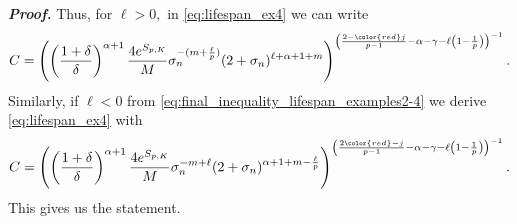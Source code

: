 \documentclass[11pt,reqno]{amsart}
\theoremstyle{definition}
\numberwithin{equation}{section}
\renewenvironment{proof}{\smallskip\noindent\emph{\textbf{Proof.}}%
  \hspace{1pt}}{\hspace{-5pt}{\nobreak\quad\nobreak\hfill\nobreak%
    $\square$\vspace{2pt}\par}\smallskip\goodbreak}
\newcommand\red[1]{{\color{red}#1}}
\newcommand{\eps}{\varepsilon}
\begin{document}
\begin{proof}
%
%
%
%
%
%
%
%
Thus, for $\ell>0,$ in \eqref{eq:lifespan_ex4} we can write  
%
\begin{align}
C=\left(\left(\frac{1+\delta}{\delta}\right)^{\alpha+1}\frac{4 e^{S_{p,K}}}{M}\sigma_n^{-(m+\frac{\ell}{p})}(2+\sigma_n)^{\ell+\alpha+1+m}\right)^{\left(\frac{2-\red{j}}{p-1}-\alpha-\gamma-\ell\left(1-\frac{1}{p}\right)\right)^{-1}}.
\end{align}
%
Similarly, if $\ell<0$ from \eqref{eq:final_inequality_lifespan_examples2-4} we derive \eqref{eq:lifespan_ex4} with 
%
\begin{align}
C=\left(\left(\frac{1+\delta}{\delta}\right)^{\alpha+1}\frac{4 e^{S_{p,K}}}{M}\sigma_n^{-m+\ell}(2+\sigma_n)^{\alpha+1+m-\frac{\ell}{p}}\right)^{\left(\frac{2\red{-j}}{p-1}-\alpha-\gamma-\ell\left(1-\frac{1}{p}\right)\right)^{-1}}.
\end{align}
This gives us the statement.
\end{proof}
\end{document}

